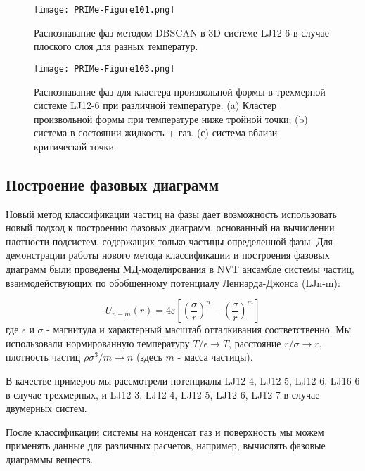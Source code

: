 \begin{figure}[!t]
    \centering
    \texttt{[image: PRIMe-Figure101.png]}
    \caption{Распознавание фаз методом DBSCAN в 3D системе LJ12-6 в случае плоского слоя для разных температур.}
    \label{D3_flat_layer}
\end{figure}


\begin{figure}[!t]
    \centering
    \texttt{[image: PRIMe-Figure103.png]}
    \caption{Распознавание фаз для кластера произвольной формы в трехмерной системе LJ12-6 при различной температуре: (a) Кластер произвольной формы при температуре ниже тройной точки; (b) система в состоянии жидкость + газ. (с) система вблизи критической точки.}
    \label{D3_free_conf}
\end{figure}



\subsection{Построение фазовых диаграмм}
\label{PRIMe-SubSecPhaseDiagram}

Новый метод классификации частиц на фазы дает возможность использовать новый подход к построению фазовых диаграмм, основанный на вычислении плотности подсистем, содержащих только частицы определенной фазы.
Для демонстрации работы нового метода классификации и построения фазовых диаграмм были проведены МД-моделирования в NVT ансамбле системы частиц, взаимодействующих по обобщенному потенциалу Леннарда-Джонса (LJn-m):

\begin{equation}
U_{n-m}(r)=4 \varepsilon\left[\left(\frac{\sigma}{r}\right)^{n}-\left(\frac{\sigma}{r}\right)^{m}\right]
\label{MACR-eq1}
\end{equation}
где $\epsilon$ и $\sigma$ - магнитуда и характерный масштаб отталкивания соответственно.
Мы использовали нормированную температуру $ T/ \epsilon \rightarrow T $, расстояние $ r/ \sigma \rightarrow r $,
плотность частиц $ \rho \sigma ^ 3 / m \rightarrow n$ (здесь $ m $ - масса частицы).

В качестве примеров мы рассмотрели потенциалы LJ12-4, LJ12-5, LJ12-6, LJ16-6 в случае трехмерных, и LJ12-3, LJ12-4, LJ12-5, LJ12-6, LJ12-7 в случае двумерных систем.

После классификации системы на конденсат газ и поверхность мы можем применять данные для различных расчетов, например, вычислять фазовые диаграммы веществ.

